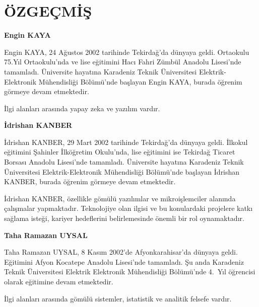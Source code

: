 \section*{ÖZGEÇMİŞ}



\textbf{Engin KAYA}

Engin KAYA, 24 Ağustos 2002 tarihinde Tekirdağ'da dünyaya geldi. Ortaokulu 75.Yıl Ortaokulu'nda ve lise eğitimini Hacı Fahri Zümbül Anadolu Lisesi'nde tamamladı. Üniversite hayatına Karadeniz Teknik Üniversitesi Elektrik-Elektronik Mühendisliği Bölümü'nde başlayan Engin KAYA, burada öğrenim görmeye devam etmektedir.

İlgi alanları arasında yapay zeka ve yazılım vardır.

\vspace{3cm}

\textbf{İdrishan KANBER}

İdrishan KANBER, 29 Mart 2002 tarihinde Tekirdağ’da dünyaya geldi. İlkokul eğitimini Şahinler İlköğretim Okulu'nda, lise eğitimini ise Tekirdağ Ticaret Borsası Anadolu Lisesi'nde tamamladı. Üniversite hayatına Karadeniz Teknik Üniversitesi Elektrik-Elektronik Mühendisliği Bölümü'nde başlayan İdrishan KANBER, burada öğrenim görmeye devam etmektedir.

İdrishan KANBER, özellikle gömülü yazılımlar ve mikroişlemciler alanında çalışmalar yapmaktadır. Teknolojiye olan ilgisi ve bu konulardaki projelere katkı sağlama isteği, kariyer hedeflerini belirlemesinde önemli bir rol oynamaktadır.

\vspace{3cm}

\textbf{Taha Ramazan UYSAL}

Taha Ramazan UYSAL, 8 Kasım 2002'de Afyonkarahisar'da dünyaya geldi. Eğitimini Afyon Kocatepe Anadolu Lisesi'nde tamamladı. Şu anda Karadeniz Teknik Üniversitesi Elektrik Elektronik Mühendisliği Bölümü'nde 4.\ Yıl öğrencisi olarak eğitimine devam etmektedir.

İlgi alanları arasında gömülü sistemler, istatistik ve analitik felsefe vardır.